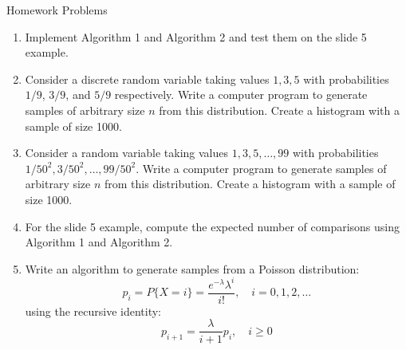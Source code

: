 \documentclass[8pt]{beamer}
\begin{document}
\begin{frame}{Homework Problems}
\begin{enumerate}
\item Implement Algorithm 1 and Algorithm 2 and test them on the slide 5 example.

\item Consider a discrete random variable taking values $1, 3, 5$ with probabilities $1/9$, $3/9$, and $5/9$ respectively. Write a computer program to generate samples of arbitrary size $n$ from this distribution. Create a histogram with a sample of size 1000.

\item Consider a random variable taking values $1, 3, 5, \dots, 99$ with probabilities $1/50^2, 3/50^2, \dots, 99/50^2$. Write a computer program to generate samples of arbitrary size $n$ from this distribution. Create a histogram with a sample of size 1000.

\item  For the slide 5 example, compute the expected number of comparisons using Algorithm 1 and Algorithm 2.

\item Write an algorithm to generate samples from a Poisson distribution:
$$
	p_i = P\{X = i\} = \frac{e^{-\lambda}\lambda^i}{i!}, \quad i = 0,1,2,\dots
$$
using the recursive identity:  
$$
	p_{i+1} = \frac{\lambda}{i+1} p_i, \quad i \ge 0
$$
\end{enumerate}
\end{frame}
\end{document}
